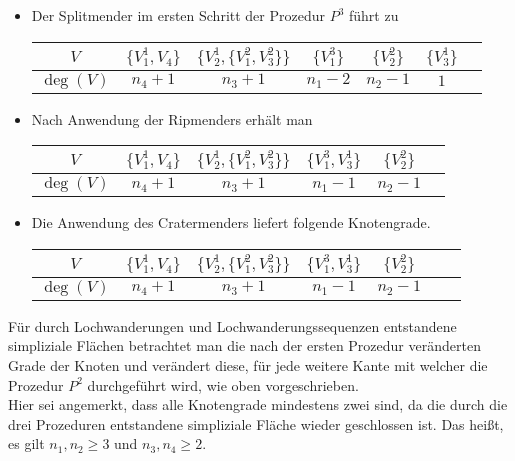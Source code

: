 \documentclass[12pt,titlepage,twoside,cleardoublepage]{article}
\theoremstyle{nummermitklammern}
\numberwithin{equation}{section}
\begin{document}
\begin{itemize}
\item Der Splitmender im ersten Schritt der Prozedur $P^3$ führt zu \begin{center}
\begin{tabular}{|c|c|c|c|c|c|c|}
\hline
  \textbf{$V$} & $\{V_1^1,V_4\}$ & $\{V_2^1,\{V_1^2,V_3^2\}\}$ & $\{V_1^3\}$ & $\{V_2^2\} $  & $\{V_3^1\}$ \\ 
  \hline
   \textbf{$\deg(V)$} & $n_4+1$ & $n_3+1$ & $n_1-2$ & $n_2-1$ & $1$  \\  
   \hline
 \end{tabular}
 \end{center}
\item Nach Anwendung der Ripmenders erhält man \begin{center}
\begin{tabular}{|c|c|c|c|c|c|}
\hline
  \textbf{$V$} & $\{V_1^1,V_4\}$ & $\{V_2^1,\{V_1^2,V_3^2\}\}$ & $\{V_1^3,V_3^1\}$ & $\{V_2^2\} $   \\ 
  \hline
   \textbf{$\deg(V)$} & $n_4+1$ & $n_3+1$ & $n_1-1$ & $n_2-1$  \\  
   \hline
 \end{tabular}
 \end{center}
\item Die Anwendung des Cratermenders liefert folgende Knotengrade.
\begin{center}
\begin{tabular}{|c|c|c|c|c|c|c|}
\hline
 \textbf{$V$} & $\{V_1^1,V_4\}$ & $\{V_2^1,\{V_1^2,V_3^2\}\}$ & $\{V_1^3,V_3^1\}$ & $\{V_2^2\} $   \\ 
  \hline
   \textbf{$\deg(V)$} & $n_4+1$ & $n_3+1$ & $n_1-1$ & $n_2-1$  \\  
   \hline
 \end{tabular}
 \end{center}
 \end{itemize}
Für durch Lochwanderungen und Lochwanderungssequenzen entstandene simpliziale Flächen betrachtet man die nach der ersten Prozedur veränderten Grade der Knoten und verändert diese, für jede weitere Kante mit welcher die Prozedur $P^2$ durchgeführt wird, wie oben vorgeschrieben.\\
Hier sei angemerkt, dass alle Knotengrade mindestens zwei sind, da die durch die drei Prozeduren entstandene simpliziale Fläche wieder geschlossen ist. Das heißt, es gilt $n_1,n_2 \geq 3$ und $n_3,n_4 \geq 2$. 
\end{document}
